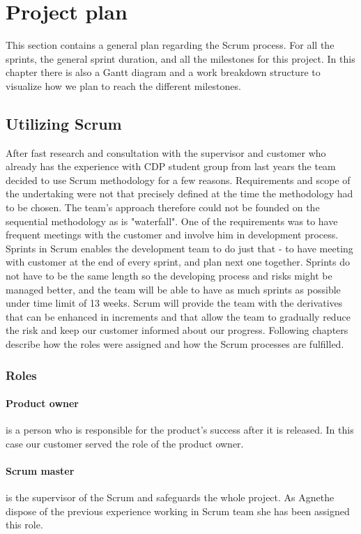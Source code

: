 \section{Project plan}
This section contains a general plan regarding the Scrum process. For all the sprints, the general sprint duration, and all the milestones for this project. In this chapter there is also a Gantt diagram and a work breakdown structure to visualize how we plan to reach the different milestones.

\subsection{Utilizing Scrum} \label{txt:utilizing_scrum}

After fast research and consultation with the supervisor and customer who already has the experience with CDP student group from last years the team decided to use Scrum methodology for a few reasons. Requirements and scope of the undertaking were not that precisely defined at the time the methodology had to be chosen. The team's approach therefore could not be founded on the sequential methodology as is "waterfall". One of the requirements was to have frequent meetings with the customer and involve him in development process. Sprints in Scrum enables the development team to do just that - 
to have meeting with customer at the end of every sprint, and plan next one together. Sprints do not have to be the same length so the developing process and risks might be managed better, and the team will be able to have as much sprints as possible under time limit of 13 weeks. Scrum will provide the team with the derivatives that can be enhanced in increments and that allow the team to gradually reduce the risk and keep our customer informed about our progress. Following chapters describe how the roles were assigned and how the Scrum processes are fulfilled.

\subsubsection{Roles}
\paragraph{Product owner} is a person who is responsible for the product's success after it is released. In this case our customer served the role of the product owner.
\paragraph{Scrum master} is the supervisor of the Scrum and safeguards the whole project. As Agnethe dispose of the previous experience working in Scrum team she has been assigned this role.

